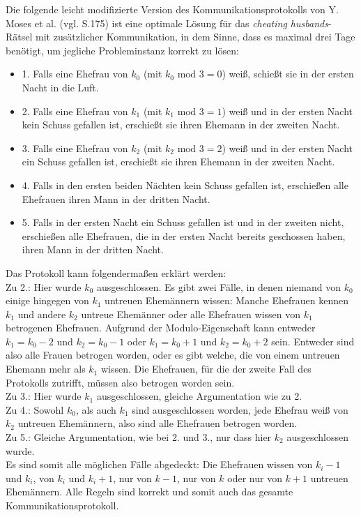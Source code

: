 Die folgende leicht modifizierte Version des Kommunikationsprotokolls von Y. Moses et al. \cite{moses1986cheating} (vgl. S.175) ist eine optimale Lösung für das \textit{cheating husbands}-Rätsel mit zusätzlicher Kommunikation, in dem Sinne, dass es maximal drei Tage benötigt, um jegliche Probleminstanz korrekt zu lösen:
\begin{itemize}
	\item 1. Falls eine Ehefrau von $k_0$ (mit $k_0 \text{ mod } 3 = 0$) weiß, schießt sie in der ersten Nacht in die Luft.
	\item 2. Falls eine Ehefrau von $k_1$ (mit $k_1 \text{ mod } 3 = 1$) weiß und in der ersten Nacht kein Schuss gefallen ist, erschießt sie ihren Ehemann in der zweiten Nacht.
	\item 3. Falls eine Ehefrau von $k_2$ (mit $k_2 \text{ mod } 3 = 2$) weiß und in der ersten Nacht ein Schuss gefallen ist, erschießt sie ihren Ehemann in der zweiten Nacht.
	\item 4. Falls in den ersten beiden Nächten kein Schuss gefallen ist, erschießen alle Ehefrauen ihren Mann in der dritten Nacht.
	\item 5. Falls in der ersten Nacht ein Schuss gefallen ist und in der zweiten nicht, erschießen alle Ehefrauen, die in der ersten Nacht bereits geschossen haben, ihren Mann in der dritten Nacht. 
\end{itemize}
Das Protokoll kann folgendermaßen erklärt werden:\\
Zu 2.: Hier wurde $k_0$ ausgeschlossen. Es gibt zwei Fälle, in denen niemand von $k_0$ einige hingegen von $k_1$ untreuen Ehemännern wissen: Manche Ehefrauen kennen $k_1$ und andere $k_2$ untreue Ehemänner oder alle Ehefrauen wissen von $k_1$ betrogenen Ehefrauen. Aufgrund der Modulo-Eigenschaft kann entweder $k_1 = k_0-2$ und $k_2 = k_0-1$ oder $k_1 = k_0+1$ und $k_2 = k_0+2$ sein. Entweder sind also alle Frauen betrogen worden, oder es gibt welche, die von einem untreuen Ehemann mehr als $k_1$ wissen. Die Ehefrauen, für die der zweite Fall des Protokolls zutrifft, müssen also betrogen worden sein.\\
Zu 3.: Hier wurde $k_1$ ausgeschlossen,  gleiche Argumentation wie zu 2.\\
Zu 4.: Sowohl $k_0$, als auch $k_1$ sind ausgeschlossen worden, jede Ehefrau weiß von $k_2$ untreuen Ehemännern, also sind alle Ehefrauen betrogen worden.\\
Zu 5.: Gleiche Argumentation, wie bei 2. und 3., nur dass hier $k_2$ ausgeschlossen wurde. \\
Es sind somit alle möglichen Fälle abgedeckt: Die Ehefrauen wissen von $k_i-1$ und $k_i$, von $k_i$ und $k_i+1$, nur von $k-1$, nur von $k$ oder nur von $k+1$ untreuen Ehemännern. Alle Regeln sind korrekt und somit auch das gesamte Kommunikationsprotokoll.\\


